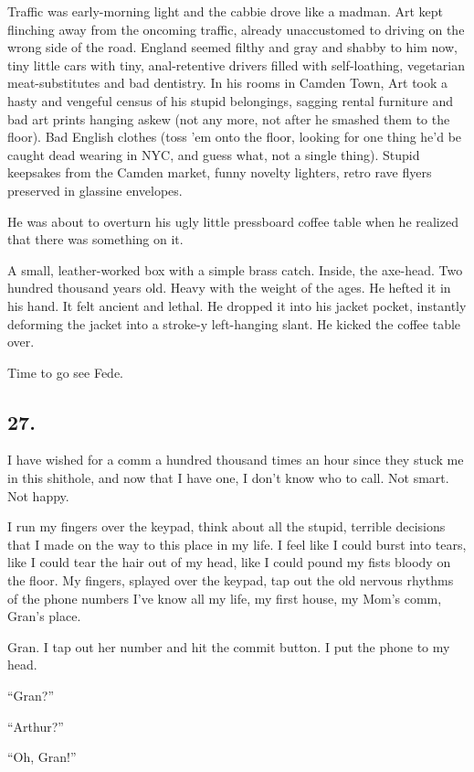 Traffic was early-morning light and the cabbie drove like a madman.
Art kept flinching away from the oncoming traffic, already
unaccustomed to driving on the wrong side of the road. England
seemed filthy and gray and shabby to him now, tiny little cars with
tiny, anal-retentive drivers filled with self-loathing, vegetarian
meat-substitutes and bad dentistry. In his rooms in Camden Town,
Art took a hasty and vengeful census of his stupid belongings,
sagging rental furniture and bad art prints hanging askew (not any
more, not after he smashed them to the floor). Bad English clothes
(toss ’em onto the floor, looking for one thing he’d be caught dead
wearing in NYC, and guess what, not a single thing). Stupid
keepsakes from the Camden market, funny novelty lighters, retro
rave flyers preserved in glassine envelopes.

He was about to overturn his ugly little pressboard coffee table
when he realized that there was something on it.

A small, leather-worked box with a simple brass catch. Inside, the
axe-head. Two hundred thousand years old. Heavy with the weight of
the ages. He hefted it in his hand. It felt ancient and lethal. He
dropped it into his jacket pocket, instantly deforming the jacket
into a stroke-y left-hanging slant. He kicked the coffee table
over.

Time to go see Fede.

\subsection{27.}

I have wished for a comm a hundred thousand times an hour since
they stuck me in this shithole, and now that I have one, I don’t
know who to call. Not smart. Not happy.

I run my fingers over the keypad, think about all the stupid,
terrible decisions that I made on the way to this place in my life.
I feel like I could burst into tears, like I could tear the hair
out of my head, like I could pound my fists bloody on the floor. My
fingers, splayed over the keypad, tap out the old nervous rhythms
of the phone numbers I’ve know all my life, my first house, my
Mom’s comm, Gran’s place.

Gran. I tap out her number and hit the commit button. I put the
phone to my head.

“Gran?”

“Arthur?”

“Oh, Gran!”

